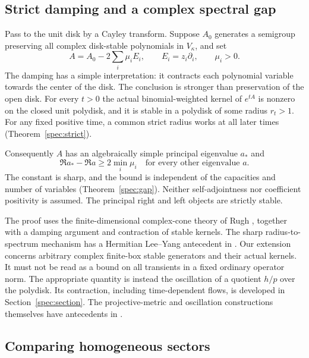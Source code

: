 \documentclass[reqno]{amsart}
\theoremstyle{definition}
\theoremstyle{remark}
\begin{document}
\subsection{Strict damping and a complex spectral gap}

Pass to the unit disk by a Cayley transform. Suppose $A_0$ generates
a semigroup preserving all complex disk-stable polynomials in
$V_\kappa$, and set
\begin{equation}\label{intro:damping}
 A=A_0-2\sum_i\mu_iE_i,\qquad E_i=z_i\partial_i,\qquad \mu_i>0.
\end{equation}
The damping has a simple interpretation: it contracts each polynomial
variable towards the center of the disk. The conclusion is stronger
than preservation of the open disk. For every $t>0$ the actual
binomial-weighted kernel of $e^{tA}$ is nonzero on the closed unit
polydisk, and it is stable in a polydisk of some radius $r_t>1$.
For any fixed positive time, a common strict radius works at all later
times (Theorem~\ref{spec:strict}).

Consequently $A$ has an algebraically simple principal eigenvalue $a_*$
and
\begin{equation}\label{intro:gap}
 \Re a_*-\Re a\geq2\min_i\mu_i
 \quad\text{for every other eigenvalue }a.
\end{equation}
The constant is sharp, and the bound is independent of the capacities
and number of variables (Theorem~\ref{spec:gap}). Neither self-adjointness
nor coefficient positivity is assumed. The principal right and left
objects are strictly stable.

The proof uses the finite-dimensional complex-cone theory of Rugh
\cite{Rugh10}, together with a damping argument and contraction of stable
kernels. The sharp radius-to-spectrum mechanism has a Hermitian
Lee--Yang antecedent in \cite{BGLW26}. Our extension concerns arbitrary
complex finite-box stable generators and their actual kernels.
It must not be read as a bound on all transients in a fixed ordinary
operator norm. The appropriate quantity is instead the oscillation
of a quotient $h/p$ over the polydisk. Its contraction, including
time-dependent flows, is developed in Section~\ref{spec:section}.
The projective-metric and oscillation constructions themselves have
antecedents in \cite{Dubois09,GaubertQu15}.

\subsection{Comparing homogeneous sectors}
\end{document}
